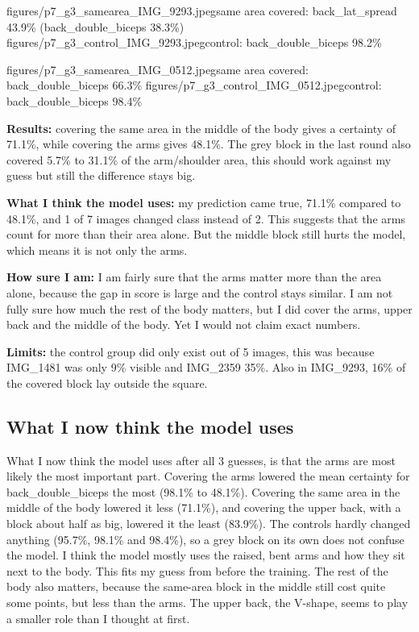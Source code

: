 \documentclass[11pt]{article}
\begin{document}
           {figures/p7_g3_samearea_IMG_9293.jpeg}{same area covered: back\_lat\_spread 43.9\% (back\_double\_biceps 38.3\%)}
           {figures/p7_g3_control_IMG_9293.jpeg}{control: back\_double\_biceps 98.2\%}

           {figures/p7_g3_samearea_IMG_0512.jpeg}{same area covered: back\_double\_biceps 66.3\%}
           {figures/p7_g3_control_IMG_0512.jpeg}{control: back\_double\_biceps 98.4\%}


\textbf{Results:} covering the same area in the middle of the body gives a certainty of 71.1\%, while covering the arms gives 48.1\%. The grey block in the last round also covered 5.7\% to 31.1\% of the arm/shoulder area, this should work against my guess but still the difference stays big.

\textbf{What I think the model uses:} my prediction came true, 71.1\% compared to 48.1\%, and 1 of 7 images changed class instead of 2. This suggests that the arms count for more than their area alone. But the middle block still hurts the model, which means it is not only the arms.

\textbf{How sure I am:} I am fairly sure that the arms matter more than the area alone, because the gap in score is large and the control stays similar. I am not fully sure how much the rest of the body matters, but I did cover the arms, upper back and the middle of the body. Yet I would not claim exact numbers.

\textbf{Limits:} the control group did only exist out of 5 images, this was because IMG\_1481 was only 9\% visible and IMG\_2359 35\%. Also in IMG\_9293, 16\% of the covered block lay outside the square.


\subsection*{What I now think the model uses}
What I now think the model uses after all 3 guesses, is that the arms are most likely the most important part. Covering the arms lowered the mean certainty for back\_double\_biceps the most (98.1\% to 48.1\%). Covering the same area in the middle of the body lowered it less (71.1\%), and covering the upper back, with a block about half as big, lowered it the least (83.9\%). The controls hardly changed anything (95.7\%, 98.1\% and 98.4\%), so a grey block on its own does not confuse the model. I think the model mostly uses the raised, bent arms and how they sit next to the body. This fits my guess from before the training. The rest of the body also matters, because the same-area block in the middle still cost quite some points, but less than the arms. The upper back, the V-shape, seems to play a smaller role than I thought at first.
\end{document}
